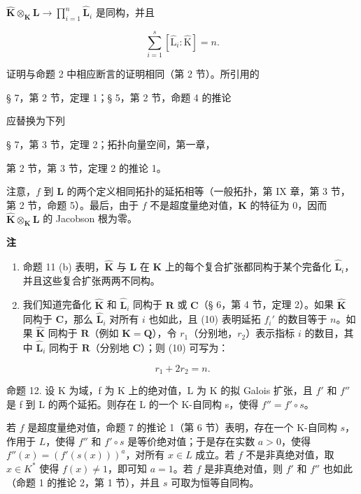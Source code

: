 \(\hat{\mathbf{K}}\otimes_{\mathbf{K}}\mathbf{L}\rightarrow \prod_{i = 1}^{n}\hat{\mathbf{L}}_i\) 是同构，并且

\[
\sum_ {i = 1} ^ {s} \left[ \hat {\mathrm{L}} _ {i}: \hat {\mathrm{K}} \right] = n.\tag{10}
\]

证明与命题 2 中相应断言的证明相同（第 2 节）。所引用的

§ 7，第 2 节，定理 1；§ 5，第 2 节，命题 4 的推论

应替换为下列

§ 7，第 3 节，定理 2；拓扑向量空间，第一章，

第 2 节，第 3 节，定理 2 的推论 1。

注意，\(f\) 到 \(\mathbf{L}\) 的两个定义相同拓扑的延拓相等（一般拓扑，第 IX 章，第 3 节，第 2 节，命题 5）。最后，由于 \(f\) 不是超度量绝对值，\(\mathbf{K}\) 的特征为 0，因而 \(\hat{\mathbf{K}} \otimes_{\mathbf{K}} \mathbf{L}\) 的 Jacobson 根为零。

\textbf{注}\par

\begin{enumerate}
\def\labelenumi{(\arabic{enumi})}
\item
  命题 11 (b) 表明，\(\hat{\mathbf{K}}\) 与 \(\mathbf{L}\) 在 \(\mathbf{K}\) 上的每个复合扩张都同构于某个完备化 \(\hat{\mathbf{L}}_i\)，并且这些复合扩张两两不同构。
\item
  我们知道完备化 \(\hat{\mathbf{K}}\) 和 \(\hat{\mathbf{L}}_i\) 同构于 \(\mathbf{R}\) 或 \(\mathbf{C}\)（§ 6，第 4 节，定理 2）。如果 \(\hat{\mathbf{K}}\) 同构于 \(\mathbf{C}\)，那么 \(\hat{\mathbf{L}}_i\) 对所有 \(i\) 也如此，且 (10) 表明延拓 \(f_i'\) 的数目等于 \(n\)。如果 \(\hat{\mathbf{K}}\) 同构于 \(\mathbf{R}\)（例如 \(\mathbf{K} = \mathbf{Q}\)），令 \(r_1\)（分别地，\(r_2\)）表示指标 \(i\) 的数目，其中 \(\hat{\mathbf{L}}_i\) 同构于 \(\mathbf{R}\)（分别地 \(\mathbf{C}\)）；则 (10) 可写为：
\end{enumerate}

\[
r _ {1} + 2 r _ {2} = n.\tag{11}
\]

命题 12. 设 K 为域，f 为 K 上的绝对值，L 为 K 的拟 Galois 扩张，且 \(f'\) 和 \(f''\) 是 f 到 L 的两个延拓。则存在 L 的一个 K-自同构 s，使得 \(f'' = f' \circ s\)。

若 \(f\) 是超度量绝对值，命题 7 的推论 1（第 6 节）表明，存在一个 K-自同构 \(s\)，作用于 \(L\)，使得 \(f''\) 和 \(f' \circ s\) 是等价绝对值；于是存在实数 \(a > 0\)，使得 \(f''(x) = (f'(s(x)))^a\)，对所有 \(x \in L\) 成立。若 \(f\) 不是非真绝对值，取 \(x \in K^*\) 使得 \(f(x) \neq 1\)，即可知 \(a = 1\)。若 \(f\) 是非真绝对值，则 \(f'\) 和 \(f''\) 也如此（命题 1 的推论 2，第 1 节），并且 \(s\) 可取为恒等自同构。

